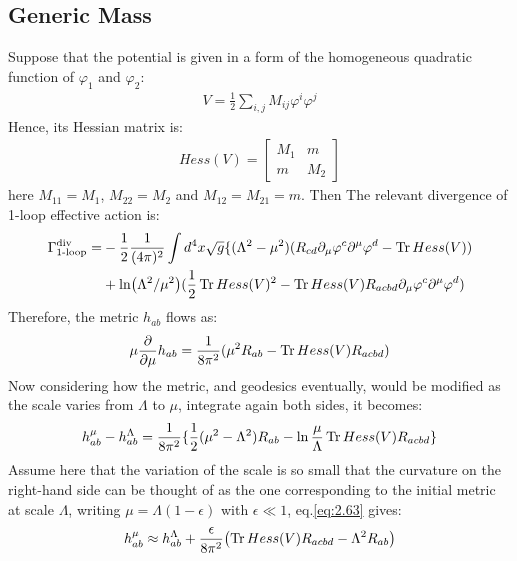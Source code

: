 \subsection{Generic Mass}
Suppose that the potential is given in a form of the homogeneous quadratic function of $\varphi_{1}$ and $\varphi _{2}$:
\begin{align}
    V= \frac{1}{2} \sum_{i,j} M_{ij} \varphi^{i} \varphi^{j}
\end{align}
Hence, its Hessian matrix is:
\begin{align}
    Hess(V) = 
    \begin{bmatrix}
        M_{1} & m \\
        m & M_{2}
    \end{bmatrix}
\end{align}
here $M_{11} = M_1$, $M_{22} = M_{2}$ and $M_{12} = M_{21} = m$. Then The relevant divergence of 1-loop effective action is:
\begin{align}
    \begin{split}
        \Gamma _{\text{1-loop}}^{\text{div}} = & -\frac{1}{2} \frac{1}{(4\pi)^2} \int d^{4}x \sqrt{g} \lbrace (\Lambda ^{2} - \mu ^{2})(R_{cd} \partial _{\mu} \varphi ^{c} \partial ^{\mu} \varphi ^{d} - \Tr Hess(V)) \\
        & + \ln (\Lambda ^{2} / \mu ^{2}) (\frac{1}{2} \Tr Hess(V)^{2}  - \Tr Hess(V) R_{acbd} \partial _{\mu} \varphi ^{c} \partial ^{\mu} \varphi ^{d})
    \end{split}
\end{align}
Therefore, the metric $h_{ab}$ flows as:
\begin{align}
    \mu \pdv{\mu} h_{ab} = \frac{1}{8\pi^2} (\mu ^{2} R_{ab} - \Tr Hess(V) R_{acbd})
\end{align}
Now considering how the metric, and geodesics eventually, would be modified as the scale varies from $\Lambda$ to $\mu$, integrate again both sides, it becomes:
\begin{align}
    \label{eq:2.63}
    h_{ab} ^{\mu} - h_{ab} ^{\Lambda} = \frac{1}{8\pi^{2}}\lbrace \frac{1}{2}(\mu ^{2} - \Lambda ^{2}) R_{ab} - \ln \frac{\mu}{\Lambda} \Tr Hess(V) R_{acbd} \rbrace
\end{align}
Assume here that the variation of the scale is so small that the curvature on the right-hand side can be thought of as the one corresponding to the initial metric at scale $\Lambda$, writing $\mu = \Lambda (1-\epsilon)$ with $\epsilon \ll 1$, eq.\ref{eq:2.63} gives:
\begin{align}
    h_{ab} ^{\mu} \approx h_{ab} ^{\Lambda} + \frac{\epsilon}{8\pi ^{2}}  \qty (\Tr Hess(V) R_{acbd} - \Lambda ^{2} R_{ab})
\end{align}
